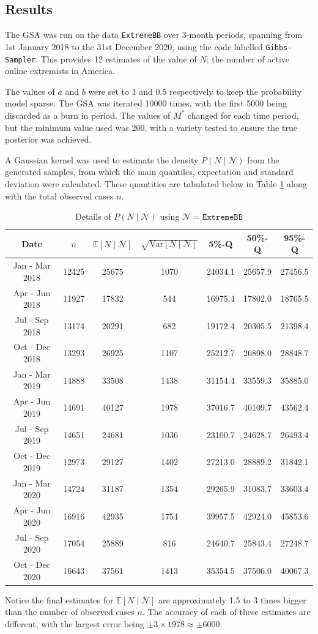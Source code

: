 \documentclass[10pt,a4paper,notitlepage]{article}
\newcommand{\E}{\mathbb{E}}
\begin{document}
\subsection{Results}\label{sc:6.1}
The GSA was run on the data \texttt{ExtremeBB} over 3-month periods, spanning from 1st January 2018 to the 31st December 2020, using the code labelled \texttt{Gibbs-Sampler}. This provides 12 estimates of the value of $N$; the number of active online extremists in America. 

The values of $a$ and $b$ were set to 1 and 0.5 respectively to keep the probability model sparse. The GSA was iterated 10000 times, with the first 5000 being discarded as a burn in period. The values of $M^{*}$ changed for each time period, but the minimum value used was 200, with a variety tested to ensure the true posterior was achieved.

A Gaussian kernel was used to estimate the density $P(N\mid\mathcal{N})$ from the generated samples, from which the main quantiles, expectation and standard deviation were calculated. These quantities are tabulated below in Table \ref{tb:2} along with the total observed cases $n$. 

\begin{table}[H]
\centering
\begin{tabular}{|c|ccc|ccc|} \hline 
Date & $n$ & $\E[N\mid\mathcal{N}]$ & $\sqrt{\text{Var}[N\mid\mathcal{N}]}$&  5\%-Q&50\%-Q&95\%-Q\\ \hline
Jan - Mar 2018&12425 & 25675 & 1070 & 24034.1 & 25657.9 & 27456.5\\ 
Apr - Jun 2018 &11927 & 17832 & 544 & 16975.4 & 17802.0 & 18765.5\\ 
Jul - Sep 2018 &13174& 20291 & 682 & 19172.4 & 20305.5 & 21398.4\\ 
Oct - Dec 2018 &13293 & 26925 & 1107 & 25212.7 & 26898.0 & 28848.7\\ 
Jan - Mar 2019 &14888 & 33508 & 1438 & 31154.4 & 33559.3 & 35885.0\\ 
Apr - Jun 2019 &14691& 40127 & 1978 & 37016.7 & 40109.7 & 43562.4\\ 
Jul - Sep 2019 &14651& 24681 & 1036 & 23100.7 & 24628.7 & 26493.4\\ 
Oct - Dec 2019 &12973 & 29127 & 1402 & 27213.0 & 28889.2 & 31842.1\\ 
Jan - Mar 2020 &14724 & 31187 & 1354 & 29265.9 & 31083.7 & 33603.4\\ 
Apr - Jun 2020 &16916& 42935 & 1754 & 39957.5 & 42924.0 & 45853.6\\ 
Jul - Sep 2020 &17054& 25889 & 816 & 24640.7 & 25843.4 & 27248.7\\ 
Oct - Dec 2020 &16643 & 37561 & 1413 & 35354.5 & 37506.0 & 40067.3\\ \hline
\end{tabular}
\caption{Details of $P(N\mid\mathcal{N})$ using $\mathcal{N}=\texttt{ExtremeBB}$}\label{tb:2}
\end{table}
Notice the final estimates for $\E[N\mid\mathcal{N}]$ are approximately 1.5 to 3 times bigger than the number of observed cases $n$. The accuracy of each of these estimates are different, with the largest error being $\pm3\times 1978 \approx \pm6000$. 
\end{document}
